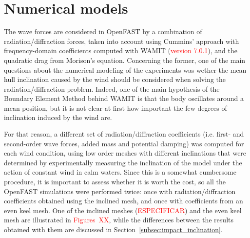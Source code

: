 \section{Numerical models} \label{sec:numerical_models}



The wave forces are considered in OpenFAST by a combination of radiation/diffraction forces, taken into account using Cummins' approach \citep{cummins1962,ogilvie1964} with frequency-domain coefficients computed with WAMIT (\textcolor{red}{version 7.0.1}), and the quadratic drag from Morison's equation. Concerning the former, one of the main questions about the numerical modeling of the experiments was wether the mean hull inclination caused by the wind should be considered when solving the radiation/diffraction problem. Indeed, one of the main hypothesis of the Boundary Element Method behind WAMIT is that the body oscillates around a mean position, but it is not clear at first how important the few degrees of inclination induced by the wind are.

For that reason, a different set of radiation/diffraction coefficients (i.e. first- and second-order wave forces, added mass and potential damping) was computed for each wind condition, using low order meshes with different inclinations that were determined by experimentally measuring the inclination of the model under the action of constant wind in calm waters. Since this is a somewhat cumbersome procedure, it is important to assess whether it is worth the cost, so all the OpenFAST simulations were performed twice: once with radiation/diffraction coefficients obtained using the inclined mesh, and once with coefficients from an even keel mesh. One of the inclined meshes (\textcolor{red}{ESPECIFICAR}) and the even keel mesh are illustrated in \textcolor{red}{Figures~XX}, while the differences between the results obtained with them are discussed in Section~\ref{subsec:impact_inclination}.
